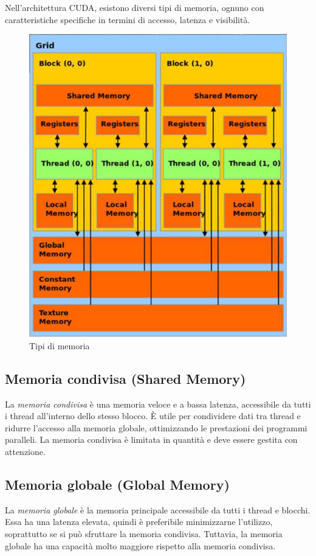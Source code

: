 \documentclass[12pt,a4paper]{report}
\begin{document}
Nell'architettura CUDA, esistono diversi tipi di memoria, ognuno con caratteristiche specifiche in termini di accesso, latenza e visibilità.


\begin{figure}[h]
    \centering
    \includegraphics[width=0.7\linewidth]{img/type_of_memory.png}
    \caption{Tipi di memoria \cite{CUDAtutorial}}
\end{figure}


\subsection{Memoria condivisa (Shared Memory)}
La \textit{memoria condivisa} è una memoria veloce e a bassa latenza, accessibile da tutti i thread all'interno dello stesso blocco. È utile per condividere dati tra thread e ridurre l'accesso alla memoria globale, ottimizzando le prestazioni dei programmi paralleli. La memoria condivisa è limitata in quantità e deve essere gestita con attenzione.

\subsection{Memoria globale (Global Memory)}
La \textit{memoria globale} è la memoria principale accessibile da tutti i thread e blocchi. Essa ha una latenza elevata, quindi è preferibile minimizzarne l'utilizzo, soprattutto se si può sfruttare la memoria condivisa. Tuttavia, la memoria globale ha una capacità molto maggiore rispetto alla memoria condivisa.
\end{document}
